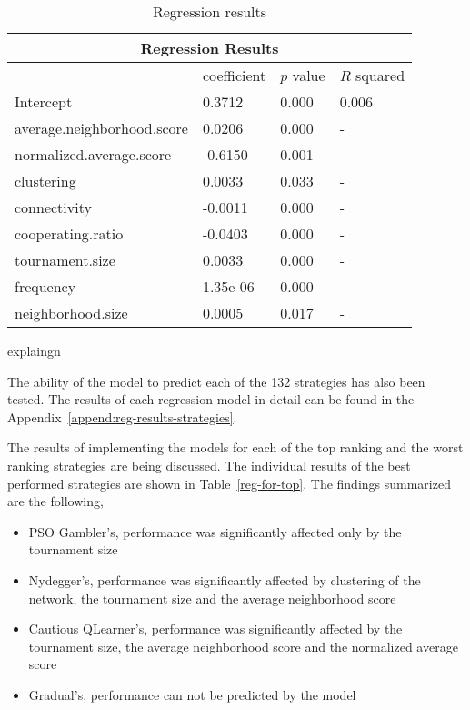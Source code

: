 \begin{table}[!hbtp]
	\centering
	\begin{adjustbox}{width=0.7\textwidth}
		\small
		\begin{tabular}{llll}
			\toprule
			\multicolumn{4}{|c|}{\textbf{Regression Results}}         \\ \hline
			                           & coefficient & \(p\) value & \(R\) squared \\ \hline
			Intercept                  & 0.3712      & 0.000       & 0.006     \\ \hline
			average.neighborhood.score & 0.0206      & 0.000       & -         \\ \hline
			normalized.average.score   & -0.6150     & 0.001       & -         \\ \hline
			clustering                 & 0.0033      & 0.033       & -         \\ \hline
			connectivity               & -0.0011     & 0.000       & -         \\ \hline
			cooperating.ratio          & -0.0403     & 0.000       & -         \\ \hline
			tournament.size            & 0.0033      & 0.000       & -         \\ \hline
			frequency                  & 1.35e-06    & 0.000       & -         \\ \hline
			neighborhood.size          & 0.0005      & 0.017       & -         \\ \bottomrule

		\end{tabular}
	\end{adjustbox}
	\caption{Regression results}
	\label{regression-complex-networks}
	explaingn
\end{table}

The ability of the model to predict each of the 132 strategies has also been
tested. The results of each regression model in detail can be found in the
Appendix~\ref{append:reg-results-strategies}.

The results of implementing the models for each of the top ranking and the worst
ranking strategies are being discussed. The individual results of the best
performed strategies are shown in Table~\ref{reg-for-top}. The findings summarized
are the following,

\begin{itemize}
	\item PSO Gambler's, performance was significantly affected only by the tournament size
	\item Nydegger's, performance was significantly affected by clustering of the network,
	      the tournament size and the average neighborhood score
	\item Cautious QLearner's, performance was significantly affected by the tournament size,
	      the average neighborhood score and the normalized average score
	\item Gradual's, performance can not be predicted by the model
\end{itemize}

